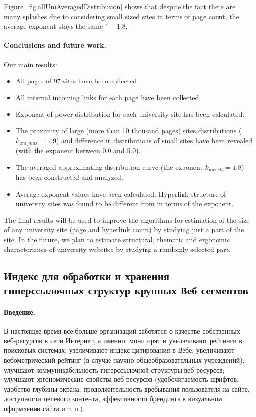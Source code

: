 Figure~\cref{fig:allUniAveragedDistribution} shows that despite the fact there are many splashes due to considering small sized sites in terms of page count, the average exponent stays the same "--- 1.8.

\paragraph{Conclusions and future work.} Our main results: 

\begin{itemize}
	\item All pages of 97 sites have been collected
	\item All internal incoming links for each page have been
	collected
	\item Exponent of power distribution for each university site
	has been calculated.
	\item The proximity of large (more than 10 thousand pages)
	sites distributions (\(k_\textit{uni\_max} = 1.9\)) and difference in
	distributions of small sites have been revealed (with
	the exponent between 0.0 and 5.0).
	\item The averaged approximating distribution curve (the
	exponent \(k_\textit{uni\_all} = 1.8\)) has been constructed and
	analyzed.
	\item Average exponent values have been calculated.
	Hyperlink structure of university sites was found to be
	different from \cite{BarabasiAlbert,BroderKumarMaghoul} in terms of the exponent.
\end{itemize}

The final results will be used to improve the algorithms for estimation of the size of any university site (page and hyperlink count) by studying just a part of the site. In the future, we plan to estimate structural, thematic and ergonomic characteristics of university websites by studying a randomly selected part. 

\subsection{Индекс для обработки и хранения гиперссылочных структур крупных Веб-сегментов}\label{subsec:ch1/sec2/sub3}

\paragraph{Введение.} В настоящее время все больше организаций заботятся о качестве собственных веб-ресурсов в сети Интернет, а именно: мониторят и увеличивают рейтинги в поисковых системах; увеличивают индекс цитирования в Вебе; увеличивают вебометрический рейтинг \cite{RankingWeb} (в случае научно-общеобразовательных учреждений); улучшают коммуникабельность гиперссылочной структуры веб-ресурсов; улучшают эргономические свойства веб-ресурсов (удобочитаемость шрифтов, удобство глубины экрана, продолжительность пребывания пользователя на сайте, доступности целевого контента, эффективности брендинга в визуальном оформлении сайта и т. п.).

